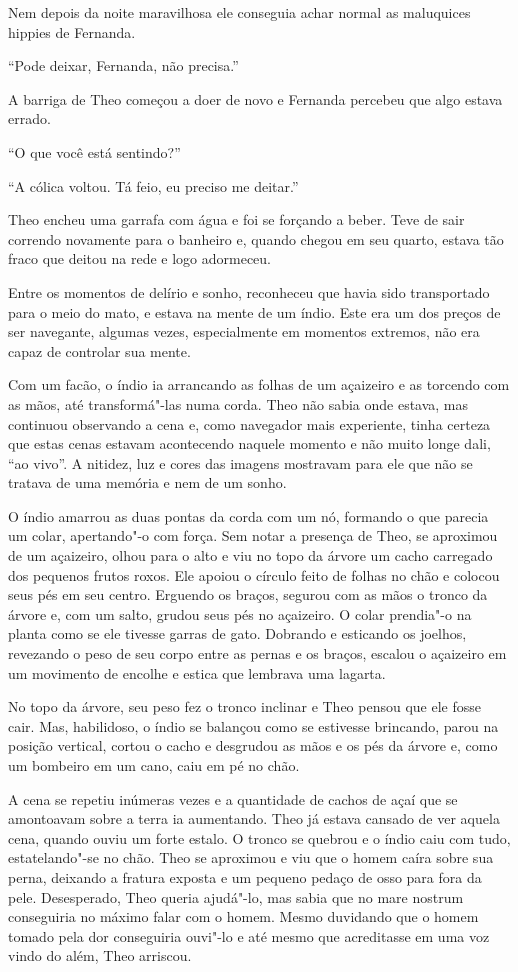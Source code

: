 Nem depois da noite maravilhosa ele conseguia achar normal as maluquices
hippies de Fernanda.

``Pode deixar, Fernanda, não precisa.''

A barriga de Theo começou a doer de novo e Fernanda percebeu que algo
estava errado.

``O que você está sentindo?''

``A cólica voltou. Tá feio, eu preciso me deitar.''

Theo encheu uma garrafa com água e foi se forçando a beber. Teve de sair
correndo novamente para o banheiro e, quando chegou em seu quarto, estava
tão fraco que deitou na rede e logo adormeceu.

Entre os momentos de delírio e sonho, reconheceu que havia sido
transportado para o meio do mato, e estava na mente de um índio. Este
era um dos preços de ser navegante, algumas vezes, especialmente em
momentos extremos, não era capaz de controlar sua mente.

Com um facão, o índio ia arrancando as folhas de um açaizeiro e as
torcendo com as mãos, até transformá"-las numa corda. Theo não sabia onde
estava, mas continuou observando a cena e, como navegador mais
experiente, tinha certeza que estas cenas estavam acontecendo naquele
momento e não muito longe dali, ``ao vivo''. A nitidez, luz e cores das
imagens mostravam para ele que não se tratava de uma memória e nem de um
sonho.

O índio amarrou as duas pontas da corda com um nó, formando o que
parecia um colar, apertando"-o com força. Sem notar a presença de Theo,
se aproximou de um açaizeiro, olhou para o alto e viu no topo da árvore
um cacho carregado dos pequenos frutos roxos. Ele apoiou o círculo feito
de folhas no chão e colocou seus pés em seu centro. Erguendo os braços,
segurou com as mãos o tronco da árvore e, com um salto, grudou seus pés
no açaizeiro. O colar prendia"-o na planta como se ele tivesse garras de
gato. Dobrando e esticando os joelhos, revezando o peso de seu corpo
entre as pernas e os braços, escalou o açaizeiro em um movimento de
encolhe e estica que lembrava uma lagarta.

No topo da árvore, seu peso fez o tronco inclinar e Theo pensou que ele
fosse cair. Mas, habilidoso, o índio se balançou como se estivesse
brincando, parou na posição vertical, cortou o cacho e desgrudou as mãos
e os pés da árvore e, como um bombeiro em um cano, caiu em pé no chão.

A cena se repetiu inúmeras vezes e a quantidade de cachos de açaí que se
amontoavam sobre a terra ia aumentando. Theo já estava cansado de ver
aquela cena, quando ouviu um forte estalo. O tronco se quebrou e o índio
caiu com tudo, estatelando"-se no chão. Theo se aproximou e viu que o
homem caíra sobre sua perna, deixando a fratura exposta e um pequeno pedaço de
osso para fora da pele. Desesperado, Theo queria ajudá"-lo, mas sabia que no
mare nostrum conseguiria no máximo falar com o homem. Mesmo duvidando que
o homem tomado pela dor conseguiria ouvi"-lo e até mesmo que acreditasse
em uma voz vindo do além, Theo arriscou.

